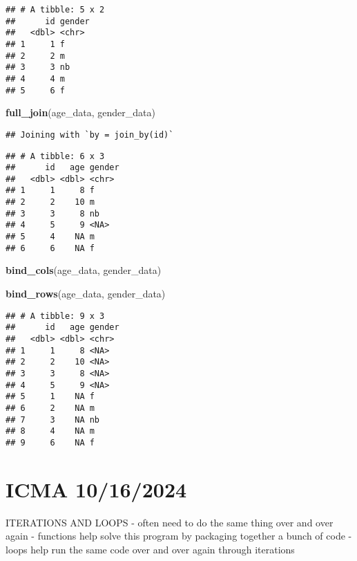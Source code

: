\documentclass[
]{article}
\newenvironment{Shaded}{\begin{snugshade}}{\end{snugshade}}
\newcommand{\FunctionTok}[1]{\textcolor[rgb]{0.13,0.29,0.53}{\textbf{#1}}}
\newcommand{\NormalTok}[1]{#1}
\begin{document}
\begin{verbatim}
## # A tibble: 5 x 2
##      id gender
##   <dbl> <chr> 
## 1     1 f     
## 2     2 m     
## 3     3 nb    
## 4     4 m     
## 5     6 f
\end{verbatim}

\begin{Shaded}
\begin{Highlighting}[]
\FunctionTok{full\_join}\NormalTok{(age\_data, gender\_data)}
\end{Highlighting}
\end{Shaded}

\begin{verbatim}
## Joining with `by = join_by(id)`
\end{verbatim}

\begin{verbatim}
## # A tibble: 6 x 3
##      id   age gender
##   <dbl> <dbl> <chr> 
## 1     1     8 f     
## 2     2    10 m     
## 3     3     8 nb    
## 4     5     9 <NA>  
## 5     4    NA m     
## 6     6    NA f
\end{verbatim}

\begin{Shaded}
\begin{Highlighting}[]
\FunctionTok{bind\_cols}\NormalTok{(age\_data, gender\_data)}
\end{Highlighting}
\end{Shaded}

\begin{Shaded}
\begin{Highlighting}[]
\FunctionTok{bind\_rows}\NormalTok{(age\_data, gender\_data)}
\end{Highlighting}
\end{Shaded}

\begin{verbatim}
## # A tibble: 9 x 3
##      id   age gender
##   <dbl> <dbl> <chr> 
## 1     1     8 <NA>  
## 2     2    10 <NA>  
## 3     3     8 <NA>  
## 4     5     9 <NA>  
## 5     1    NA f     
## 6     2    NA m     
## 7     3    NA nb    
## 8     4    NA m     
## 9     6    NA f
\end{verbatim}

\section{ICMA 10/16/2024}\label{icma-10162024}

ITERATIONS AND LOOPS - often need to do the same thing over and over
again - functions help solve this program by packaging together a bunch
of code - loops help run the same code over and over again through
iterations
\end{document}

